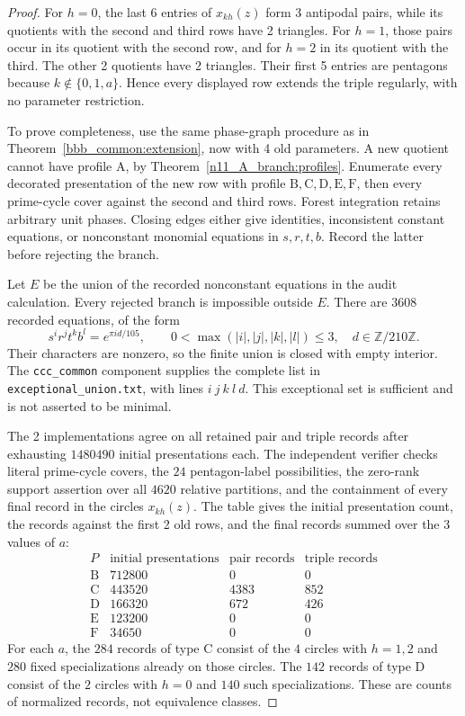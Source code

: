 \documentclass[11pt,a4paper]{article}
\theoremstyle{plain}
\theoremstyle{definition}
\theoremstyle{plain}
\begin{document}
\begin{proof}
For $h=0$, the last 6 entries of $x_{kh}(z)$ form 3 antipodal pairs, while its quotients with the second and third rows have 2 triangles. For $h=1$, those pairs occur in its quotient with the second row, and for $h=2$ in its quotient with the third. The other 2 quotients have 2 triangles. Their first 5 entries are pentagons because $k\notin\{0,1,a\}$. Hence every displayed row extends the triple regularly, with no parameter restriction.

To prove completeness, use the same phase-graph procedure as in Theorem~\ref{bbb_common:extension}, now with 4 old parameters. A new quotient cannot have profile $\mathrm{A}$, by Theorem~\ref{n11_A_branch:profiles}. Enumerate every decorated presentation of the new row with profile $\mathrm{B},\mathrm{C},\mathrm{D},\mathrm{E},\mathrm{F}$, then every prime-cycle cover against the second and third rows. Forest integration retains arbitrary unit phases. Closing edges either give identities, inconsistent constant equations, or nonconstant monomial equations in $s,r,t,b$. Record the latter before rejecting the branch.

Let $E$ be the union of the recorded nonconstant equations in the audit calculation. Every rejected branch is impossible outside $E$. There are $3608$ recorded equations, of the form
$$s^i r^j t^k b^l=e^{\pi i d/105},\qquad
0<\max(|i|,|j|,|k|,|l|)\le3,\quad d\in\mathbb Z/210\mathbb Z.$$
Their characters are nonzero, so the finite union is closed with empty interior. The \texttt{ccc\_common} component supplies the complete list in \texttt{exceptional\_union.txt}, with lines $i\ j\ k\ l\ d$. This exceptional set is sufficient and is not asserted to be minimal.

The 2 implementations agree on all retained pair and triple records after exhausting $1480490$ initial presentations each. The independent verifier checks literal prime-cycle covers, the $24$ pentagon-label possibilities, the zero-rank support assertion over all $4620$ relative partitions, and the containment of every final record in the circles $x_{kh}(z)$. The table gives the initial presentation count, the records against the first 2 old rows, and the final records summed over the $3$ values of $a$:
$$\begin{array}{c|r|r|r}
P&\text{initial presentations}&\text{pair records}&\text{triple records}\\\hline
\mathrm{B}&712800&0&0\\
\mathrm{C}&443520&4383&852\\
\mathrm{D}&166320&672&426\\
\mathrm{E}&123200&0&0\\
\mathrm{F}&34650&0&0
\end{array}$$
For each $a$, the $284$ records of type $\mathrm{C}$ consist of the $4$ circles with $h=1,2$ and $280$ fixed specializations already on those circles. The $142$ records of type $\mathrm{D}$ consist of the $2$ circles with $h=0$ and $140$ such specializations. These are counts of normalized records, not equivalence classes.


\end{proof}
\end{document}

